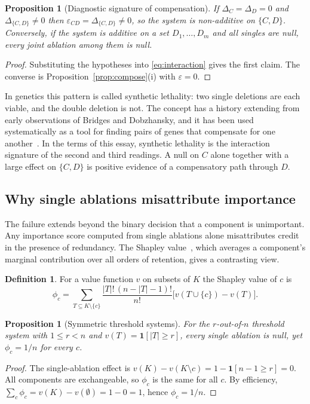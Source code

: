 \documentclass[11pt]{article}
\newtheorem{proposition}[theorem]{Proposition}
\theoremstyle{definition}
\newtheorem{definition}[theorem]{Definition}
\theoremstyle{remark}
\newcommand{\ind}{\mathbf{1}}
\begin{document}
\begin{proposition}[Diagnostic signature of compensation]\label{prop:signature}
If $\Delta_C=\Delta_D=0$ and $\Delta_{\{C,D\}}\ne 0$ then $\varepsilon_{CD}=\Delta_{\{C,D\}}\ne 0$, so the system is non-additive on $\{C,D\}$. Conversely, if the system is additive on a set $D_1,\dots,D_m$ and all singles are null, every joint ablation among them is null.
\end{proposition}
\begin{proof}
Substituting the hypotheses into \eqref{eq:interaction} gives the first claim. The converse is Proposition~\ref{prop:compose}(i) with $\varepsilon=0$.
\end{proof}

In genetics this pattern is called synthetic lethality: two single deletions are each viable, and the double deletion is not. The concept has a history extending from early observations of Bridges and Dobzhansky, and it has been used systematically as a tool for finding pairs of genes that compensate for one another~\cite{hartwell1997}. In the terms of this essay, synthetic lethality is the interaction signature of the second and third readings. A null on $C$ alone together with a large effect on $\{C,D\}$ is positive evidence of a compensatory path through $D$.

\subsection{Why single ablations misattribute importance}

The failure extends beyond the binary decision that a component is unimportant. Any importance score computed from single ablations alone misattributes credit in the presence of redundancy. The Shapley value~\cite{shapley1953}, which averages a component's marginal contribution over all orders of retention, gives a contrasting view.

\begin{definition}
For a value function $v$ on subsets of $K$ the Shapley value of $c$ is
\[
\phi_c=\sum_{T\subseteq K\setminus\{c\}}\frac{|T|!\,(n-|T|-1)!}{n!}\bigl[v(T\cup\{c\})-v(T)\bigr].
\]
\end{definition}

\begin{proposition}[Symmetric threshold systems]\label{prop:shapley}
For the $r$-out-of-$n$ threshold system with $1\le r<n$ and $v(T)=\ind[|T|\ge r]$, every single ablation is null, yet $\phi_c=1/n$ for every $c$.
\end{proposition}
\begin{proof}
The single-ablation effect is $v(K)-v(K\setminus c)=1-\ind[n-1\ge r]=0$. All components are exchangeable, so $\phi_c$ is the same for all $c$. By efficiency, $\sum_c\phi_c=v(K)-v(\emptyset)=1-0=1$, hence $\phi_c=1/n$.
\end{proof}
\end{document}

